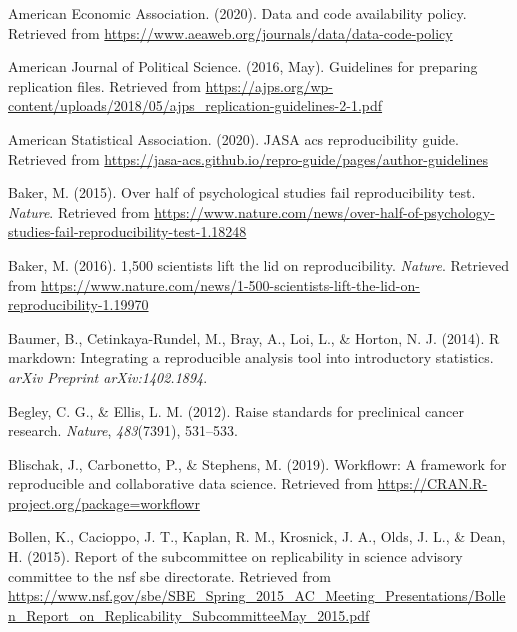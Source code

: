 \documentclass[12pt,twoside]{reedthesis}
\begin{document}

\noindent

\setlength{\parindent}{-0.20in} \setlength{\leftskip}{0.20in}
\setlength{\parskip}{8pt}

\hypertarget{refs}{}
\hypertarget{ref-aee-policy}{}
American Economic Association. (2020). Data and code availability
policy. Retrieved from
\url{https://www.aeaweb.org/journals/data/data-code-policy}

\hypertarget{ref-ajps-guidelines}{}
American Journal of Political Science. (2016, May). Guidelines for
preparing replication files. Retrieved from
\url{https://ajps.org/wp-content/uploads/2018/05/ajps_replication-guidelines-2-1.pdf}

\hypertarget{ref-asa-guide}{}
American Statistical Association. (2020). JASA acs reproducibility
guide. Retrieved from
\url{https://jasa-acs.github.io/repro-guide/pages/author-guidelines}

\hypertarget{ref-nature-psych}{}
Baker, M. (2015). Over half of psychological studies fail
reproducibility test. \emph{Nature}. Retrieved from
\url{https://www.nature.com/news/over-half-of-psychology-studies-fail-reproducibility-test-1.18248}

\hypertarget{ref-nature-crisis}{}
Baker, M. (2016). 1,500 scientists lift the lid on reproducibility.
\emph{Nature}. Retrieved from
\url{https://www.nature.com/news/1-500-scientists-lift-the-lid-on-reproducibility-1.19970}

\hypertarget{ref-baumer2014r}{}
Baumer, B., Cetinkaya-Rundel, M., Bray, A., Loi, L., \& Horton, N. J.
(2014). R markdown: Integrating a reproducible analysis tool into
introductory statistics. \emph{arXiv Preprint arXiv:1402.1894}.

\hypertarget{ref-begley2012raise}{}
Begley, C. G., \& Ellis, L. M. (2012). Raise standards for preclinical
cancer research. \emph{Nature}, \emph{483}(7391), 531--533.

\hypertarget{ref-R-workflowr}{}
Blischak, J., Carbonetto, P., \& Stephens, M. (2019). Workflowr: A
framework for reproducible and collaborative data science. Retrieved
from \url{https://CRAN.R-project.org/package=workflowr}

\hypertarget{ref-arlington}{}
Bollen, K., Cacioppo, J. T., Kaplan, R. M., Krosnick, J. A., Olds, J.
L., \& Dean, H. (2015). Report of the subcommittee on replicability in
science advisory committee to the nsf sbe directorate. Retrieved from
\url{https://www.nsf.gov/sbe/SBE_Spring_2015_AC_Meeting_Presentations/Bollen_Report_on_Replicability_SubcommitteeMay_2015.pdf}
\end{document}
